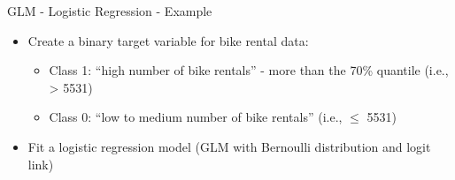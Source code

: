 \documentclass[11pt,compress,t,notes=noshow, aspectratio=169, xcolor=table]{beamer}
\begin{document}
\begin{frame}{GLM - Logistic Regression - Example}

\begin{itemize}
    \item Create a binary target variable for bike rental data:
    \begin{itemize}
        \item Class 1: ``high number of bike rentals'' - more than the 70\% quantile (i.e.,  > 5531)
        \item Class 0: ``low to medium number of bike rentals'' (i.e.,  $\leq$ 5531)
    \end{itemize}
    \item Fit a logistic regression model (GLM with Bernoulli distribution and logit link)
\end{itemize}


\end{frame}
\end{document}
